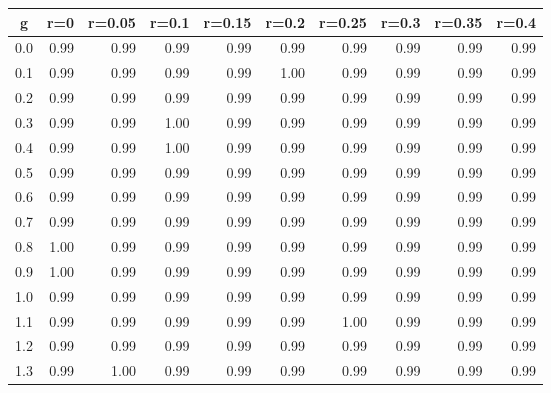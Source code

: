 %
\begin{table}[!tbp]
 \begin{center}
 \begin{tabular}{rrrrrrrrrr}\hline\hline
\multicolumn{1}{c}{g}&\multicolumn{1}{c}{r=0}&\multicolumn{1}{c}{r=0.05}&\multicolumn{1}{c}{r=0.1}&\multicolumn{1}{c}{r=0.15}&\multicolumn{1}{c}{r=0.2}&\multicolumn{1}{c}{r=0.25}&\multicolumn{1}{c}{r=0.3}&\multicolumn{1}{c}{r=0.35}&\multicolumn{1}{c}{r=0.4}\tabularnewline
\hline
0.0&0.99&0.99&0.99&0.99&0.99&0.99&0.99&0.99&0.99\tabularnewline
0.1&0.99&0.99&0.99&0.99&1.00&0.99&0.99&0.99&0.99\tabularnewline
0.2&0.99&0.99&0.99&0.99&0.99&0.99&0.99&0.99&0.99\tabularnewline
0.3&0.99&0.99&1.00&0.99&0.99&0.99&0.99&0.99&0.99\tabularnewline
0.4&0.99&0.99&1.00&0.99&0.99&0.99&0.99&0.99&0.99\tabularnewline
0.5&0.99&0.99&0.99&0.99&0.99&0.99&0.99&0.99&0.99\tabularnewline
0.6&0.99&0.99&0.99&0.99&0.99&0.99&0.99&0.99&0.99\tabularnewline
0.7&0.99&0.99&0.99&0.99&0.99&0.99&0.99&0.99&0.99\tabularnewline
0.8&1.00&0.99&0.99&0.99&0.99&0.99&0.99&0.99&0.99\tabularnewline
0.9&1.00&0.99&0.99&0.99&0.99&0.99&0.99&0.99&0.99\tabularnewline
1.0&0.99&0.99&0.99&0.99&0.99&0.99&0.99&0.99&0.99\tabularnewline
1.1&0.99&0.99&0.99&0.99&0.99&1.00&0.99&0.99&0.99\tabularnewline
1.2&0.99&0.99&0.99&0.99&0.99&0.99&0.99&0.99&0.99\tabularnewline
1.3&0.99&1.00&0.99&0.99&0.99&0.99&0.99&0.99&0.99\tabularnewline
\hline
\end{tabular}

\end{center}

\end{table}

